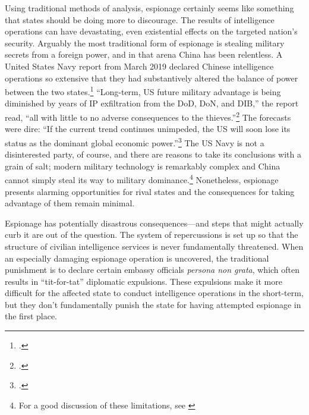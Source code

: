 \documentclass[14pt]{extarticle}
\begin{document}

Using traditional methods of analysis, espionage certainly seems like something that states should be doing more to discourage. The results of intelligence operations can have devastating, even existential effects on the targeted nation's security. Arguably the most traditional form of espionage is stealing military secrets from a foreign power, and in that arena China has been relentless. A United States Navy report from March 2019 declared Chinese intelligence operations so extensive that they had substantively altered the balance of power between the two states.\footcite{lubold_navy_2019} \enquote{Long-term, US future military advantage is being diminished by years of IP exfiltration from the DoD, DoN, and DIB,} the report read, \enquote{all with little to no adverse consequences to the thieves.}\footcite[p.~6]{bayer_cybersecurity_2019} The forecasts were dire: \enquote{If the current trend continues unimpeded, the US will soon lose its status as the dominant global economic power.}\footcite[p.~5]{bayer_cybersecurity_2019} The US Navy is not a disinterested party, of course, and there are reasons to take its conclusions with a grain of salt; modern military technology is remarkably complex and China cannot simply steal its way to military dominance.\footnote{For a good discussion of these limitations, see \cite{gilli_why_2019}} Nonetheless, espionage presents alarming opportunities for rival states and the consequences for taking advantage of them remain minimal.

Espionage has potentially disastrous consequences---and steps that might actually curb it are out of the question. The system of repercussions is set up so that the structure of civilian intelligence services is never fundamentally threatened. When an especially damaging espionage operation is uncovered, the traditional punishment is to declare certain embassy officials \emph{persona non grata}, which often results in \enquote{tit-for-tat} diplomatic expulsions. These expulsions make it more difficult for the affected state to conduct intelligence operations in the short-term, but they don't fundamentally punish the state for having attempted espionage in the first place.
\end{document}
